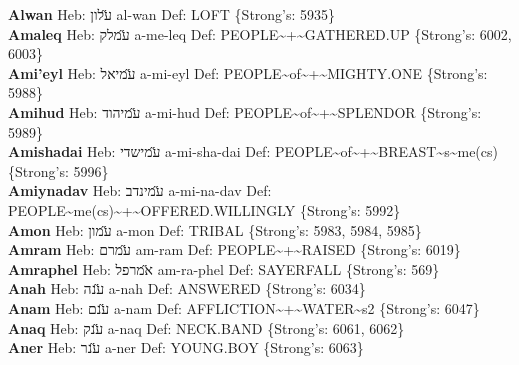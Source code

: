 {\textbf{Alwan} Heb: {\large\H עלון} al-wan Def: LOFT \{Strong's: 5935\}\hfill{}\\

\textbf{Amaleq} Heb: {\large\H עמלק} a-me-leq Def: PEOPLE\textasciitilde{}+\textasciitilde{}GATHERED.UP \{Strong's: 6002, 6003\}\hfill{}\\

\textbf{Ami'eyl} Heb: {\large\H עמיאל} a-mi-eyl Def: PEOPLE\textasciitilde{}of\textasciitilde{}+\textasciitilde{}MIGHTY.ONE \{Strong's: 5988\}\hfill{}\\

\textbf{Amihud} Heb: {\large\H עמיהוד} a-mi-hud Def: PEOPLE\textasciitilde{}of\textasciitilde{}+\textasciitilde{}SPLENDOR \{Strong's: 5989\}\hfill{}\\

\textbf{Amishadai} Heb: {\large\H עמישדי} a-mi-sha-dai Def: PEOPLE\textasciitilde{}of\textasciitilde{}+\textasciitilde{}BREAST\textasciitilde{}s\textasciitilde{}me(cs) \{Strong's: 5996\}\hfill{}\\

\textbf{Amiynadav} Heb: {\large\H עמינדב} a-mi-na-dav Def: PEOPLE\textasciitilde{}me(cs)\textasciitilde{}+\textasciitilde{}OFFERED.WILLINGLY \{Strong's: 5992\}\hfill{}\\

\textbf{Amon} Heb: {\large\H עמון} a-mon Def: TRIBAL \{Strong's: 5983, 5984, 5985\}\hfill{}\\

\textbf{Amram} Heb: {\large\H עמרם} am-ram Def: PEOPLE\textasciitilde{}+\textasciitilde{}RAISED \{Strong's: 6019\}\hfill{}\\

\textbf{Amraphel} Heb: {\large\H אמרפל} am-ra-phel Def: SAYERFALL \{Strong's: 569\}\hfill{}\\

\textbf{Anah} Heb: {\large\H ענה} a-nah Def: ANSWERED \{Strong's: 6034\}\hfill{}\\

\textbf{Anam} Heb: {\large\H ענם} a-nam Def: AFFLICTION\textasciitilde{}+\textasciitilde{}WATER\textasciitilde{}s2 \{Strong's: 6047\}\hfill{}\\

\textbf{Anaq} Heb: {\large\H ענק} a-naq Def: NECK.BAND \{Strong's: 6061, 6062\}\hfill{}\\

\textbf{Aner} Heb: {\large\H ענר} a-ner Def: YOUNG.BOY \{Strong's: 6063\}\hfill{}\\

}
